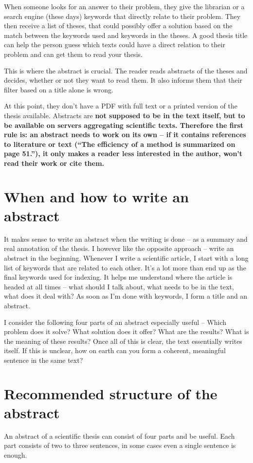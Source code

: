 When someone looks for an answer to their problem, they give the librarian or a search engine (these days) keywords that directly relate to their problem. They then receive a list of theses, that could possibly offer a solution based on the match between the keywords used and keywords in the theses. A good thesis title can help the person guess which texts could have a direct relation to their problem and can get them to read your thesis.

This is where the abstract is crucial. The reader reads abstracts of the theses and decides, whether or not they want to read them. It also informs them that their filter based on a title alone is wrong.

At this point, they don't have a PDF with full text or a printed version of the thesis available. Abstracts are \bf not \rm supposed to be in the text itself, but to be available on servers aggregating scientific texts. Therefore the first rule is: an abstract needs to work on its own -- if it contains references to literature or text (``The efficiency of a method is summarized on page 51.''), it only makes a reader less interested in the author, won't read their work or cite them.


\section{When and how to write an abstract}
It makes sense to write an abstract when the writing is done -- as a summary and real annotation of the thesis.
I however like the opposite approach -- write an abstract in the beginning. Whenever I write a scientific article, I start with a long list of keywords that are related to each other. It's a lot more than end up as the final keywords used for indexing. It helps me understand where the article is headed at all times -- what should I talk about, what needs to be in the text, what does it deal with? As soon as I'm done with keywords, I form a title and an abstract.

I consider the following four parts of an abstract especially useful -- Which problem does it solve? What solution does it offer? What are the results? What is the meaning of these results? Once all of this is clear, the text essentially writes itself. If this is unclear, how on earth can you form a coherent, meaningful sentence in the same text?


\section{Recommended structure of the abstract}
An abstract of a scientific thesis can consist of four parts and be useful. Each part consists of two to three sentences, in some cases even a single sentence is enough.


